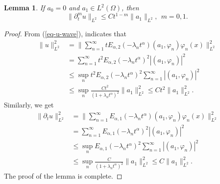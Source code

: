 \documentclass[11pt]{article}
\newtheorem{lemma}{Lemma}[section]
\numberwithin{equation}{section}
\begin{document}
\begin{lemma}\label{lem-reg-L2-1}
If $a_0=0$ and $a_1\in L^2(\Omega)$, then
\[
\|\partial_t^mu\|_{L^2}\le Ct^{1-m}\|a_1\|_{L^2},~~m=0,1.
\]
\end{lemma}
\begin{proof}
From (\ref{eq-u-wave}), indicates that
\begin{align*}
\|u\|_{L^2}^2
& = \bigg\|\sum_{n=1}^{\infty}  tE_{\alpha,2}(-\lambda_n t^\alpha)(a_1, \varphi_n) \varphi_n(x)\bigg\|_{L^2}^2\\
& = \sum_{n=1}^{\infty}  t^2E_{\alpha,2}(-\lambda_n t^\alpha)^2|(a_1, \varphi_n)|^2 \\
&\le \sup_nt^2E_{\alpha,2}(-\lambda_n t^\alpha)^2\sum_{n=1}^{\infty}|(a_1, \varphi_n)|^2\\
&\le \sup_n\frac{Ct^2}{(1+\lambda_nt^\alpha)^2}\|a_1\|_{L^2}^2
\le Ct^{2}\|a_1\|_{L^2}^2.
\end{align*}
Similarly, we get
\begin{align*}
\|\partial_tu\|_{L^2}^2
& = \bigg\|\sum_{n=1}^{\infty}  E_{\alpha,1}(-\lambda_n t^\alpha)(a_1, \varphi_n) \varphi_n(x)\bigg\|_{L^2}^2\\
& = \sum_{n=1}^{\infty} E_{\alpha,1}(-\lambda_n t^\alpha)^2|(a_1, \varphi_n)|^2 \\
&\le \sup_nE_{\alpha,1}(-\lambda_n t^\alpha)^2\sum_{n=1}^{\infty}|(a_1, \varphi_n)|^2\\
&\le \sup_n\frac{C}{(1+\lambda_nt^\alpha)^2}\|a_1\|_{L^2}^2
\le C\|a_1\|_{L^2}^2.
\end{align*}
The proof of the lemma is complete.
\end{proof}
\end{document}
